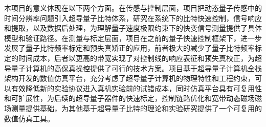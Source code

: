 \documentclass[a4paper,12pt]{article}
\begin{document}
\par 本项目的意义体现在以下两个方面。在传感与控制层面，项目把动态量子传感中的时间分辨率问题引入超导量子比特体系，研究在系统下的比特快速控制，信号响应和提取，以及数据后处理，为理解量子速度极限约束下的快变信号测量提供了具体模型和验证路径。在测量与标定层面，项目在之前的量子快速控制框架下，进一步发展了量子比特频率标定和预失真矫正的应用，前者极大的减少了量子比特频率标定的时间成本，后者以更高的带宽实现了对控制线的响应表征和预失真校正，为超导量子计算机的高保真操控提供了可行的技术方案。项目基于超导量子计算机全栈架构开发的数值仿真平台，充分考虑了超导量子计算机的物理特性和工程约束，可以有效降低新的实验协议进入真机实验前的试错成本，同时仿真平台具有可复用性和可扩展性，为后续的超导量子器件的快速标定，控制链路优化和宽带动态磁场磁场测量提供基础，为其他基于超导量子比特的理论和实验研究提供了一个可复用的数值仿真工具。



\vspace{1cm}
\end{document}
